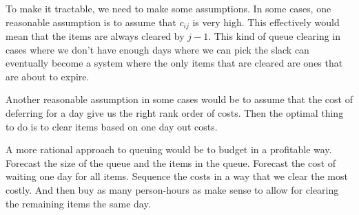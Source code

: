 \documentclass[12pt, letterpaper]{article}
\begin{document}
To make it tractable, we need to make some assumptions. In some cases, one reasonable assumption is to assume that $c_{ij}$ is very high. This effectively would mean that the items are always cleared by $j-1$. This kind of queue clearing in cases where we don't have enough days where we can pick the slack can eventually become a system where the only items that are cleared are ones that are about to expire. 

Another reasonable assumption in some cases would be to assume that the cost of deferring for a day give us the right rank order of costs. Then the optimal thing to do is to clear items based on one day out costs.

A more rational approach to queuing would be to budget in a profitable way. Forecast the size of the queue and the items in the queue. Forecast the cost of waiting one day for all items. Sequence the costs in a way that we clear the most costly. And then buy as many person-hours as make sense to allow for clearing the remaining items the same day.
\end{document}
